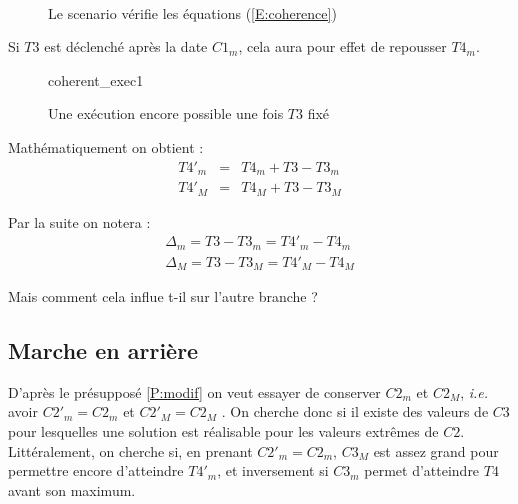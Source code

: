 \documentclass[10pt,a4paper]{article}
\begin{document}
	\begin{figure}[htp]
	\centering
		 \\
	\caption{Le scenario vérifie les équations (\ref{E:coherence})}
	\end{figure}

Si $T3$ est déclenché après la date $C1_m$, cela aura pour effet de repousser $T4_m$.
	
	\begin{figure}[htp]
	\centering
		
		\schemaScenario coherent_exec1
		\caption{Une exécution encore possible une fois $T3$ fixé}
		\label{S:coherent_exec1}
	\end{figure}

Mathématiquement on obtient :
	\begin{eqnarray}
		T4'_m &=& T4_m + T3 - T3_m \\
		T4'_M &=& T4_M + T3 - T3_M \nonumber
		\label{E:simplePropagation}
	\end{eqnarray}
	
	Par la suite on notera :
	\begin{eqnarray}
		\Delta{}_m = T3 - T3_m = T4'_m - T4_m \\
		\Delta{}_M = T3 - T3_M = T4'_M - T4_M \nonumber
		\label{E:delta}
	\end{eqnarray}

Mais comment cela influe t-il sur l'autre branche ?

	\subsection{Marche en arrière}

D'après le présupposé \ref{P:modif} on veut essayer de conserver $C2_m$ et $C2_M$, \textit{i.e.} avoir $C2'_m = C2_m$ et $C2'_M = C2_M$ . On cherche donc si il existe des valeurs de $C3$ pour lesquelles une solution est réalisable pour les valeurs extrêmes de $C2$. Littéralement, on cherche si, en prenant $C2'_m = C2_m$, $C3_M$ est assez grand pour permettre encore d'atteindre $T4'_m$, et inversement si $C3_m$ permet d'atteindre $T4$ avant son maximum.
\end{document}
